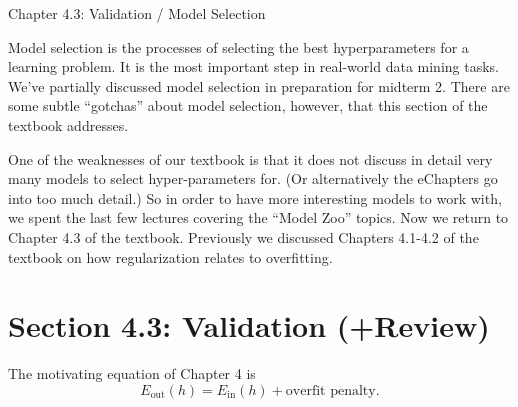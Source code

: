 \documentclass[10pt]{exam}
\theoremstyle{definition}
\newcommand{\Ein}{E_{\text{in}}}
\newcommand{\Eout}{E_{\text{out}}}
\begin{document}
\begin{center}
{
\Huge
Chapter 4.3: Validation / Model Selection
}
\end{center}


\noindent
Model selection is the processes of selecting the best hyperparameters for a learning problem.
It is the most important step in real-world data mining tasks.
We've partially discussed model selection in preparation for midterm 2.
There are some subtle ``gotchas'' about model selection,
however, that this section of the textbook addresses.

One of the weaknesses of our textbook is that it does not discuss in detail very many models to select hyper-parameters for.
(Or alternatively the eChapters go into too much detail.)
So in order to have more interesting models to work with,
we spent the last few lectures covering the ``Model Zoo'' topics.
Now we return to Chapter 4.3 of the textbook.
Previously we discussed Chapters 4.1-4.2 of the textbook on how regularization relates to overfitting.

\section*{Section 4.3: Validation (+Review)}

The motivating equation of Chapter 4 is
\begin{equation}
    \Eout(h) = \Ein(h) + \text{overfit penalty}.
\end{equation}


\vspace{2in}
\end{document}

